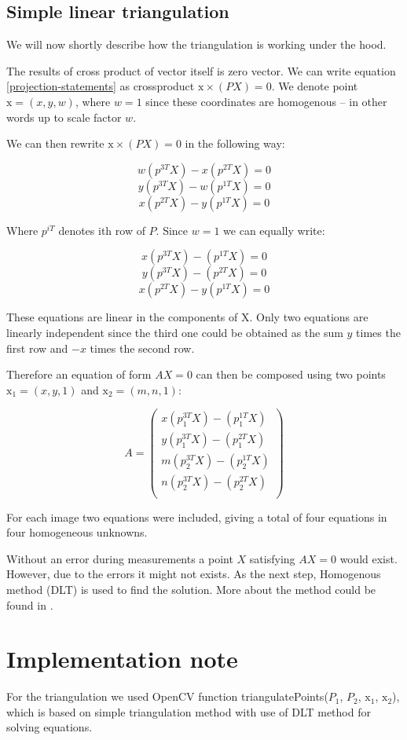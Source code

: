 \subsection{Simple linear triangulation}

We will now shortly describe how the triangulation is working under the hood.

The results of cross product of vector itself is zero vector. We can write
equation \ref{projection-statements} as crossproduct $\mathrm{x} \times (PX) = 0$. We
denote point $\mathrm{x} = (x, y, w)$, where $w = 1$ since these coordinates are
homogenous -- in other words up to scale factor $w$.

We can then rewrite $\mathrm{x} \times (PX) = 0$ in the following way:

$$ w(p^{3T}X) - x(p^{2T}X) = 0 $$
$$ y(p^{3T}X) - w(p^{1T}X) = 0 $$
$$ x(p^{2T}X) - y(p^{1T}X) = 0 $$

Where $p^{iT}$ denotes ith row of $P$. Since $w = 1$ we can equally write:

$$ x(p^{3T}X) - (p^{1T}X) = 0 $$
$$ y(p^{3T}X) - (p^{2T}X) = 0 $$
$$ x(p^{2T}X) - y(p^{1T}X) = 0 $$

These equations are linear in the components of X. Only two equations are
linearly independent since the third one could be obtained as the sum $y$
times the first row and $-x$ times the second row.

Therefore an equation of form $AX = 0$ can then be composed using two points $\mathrm{x_1} = (x, y, 1)$ and $\mathrm{x_2} = (m, n, 1)$:

\[
A = \begin{pmatrix}
x(p_1^{3T}X) - (p_1^{1T}X) \\
y(p_1^{3T}X) - (p_1^{2T}X) \\
m(p_2^{3T}X) - (p_2^{1T}X) \\
n(p_2^{3T}X) - (p_2^{2T}X) \\
\end{pmatrix}
\]

For each image two equations were included, giving a total of four equations in
four homogeneous unknowns.

Without an error during measurements a point $X$ satisfying $AX = 0$ would
exist. However, due to the errors it might not exists. As the next step, Homogenous
method (DLT) is used to find the solution. More about the method could be found
in \citet*{multiple-view-geometry}.

\section{Implementation note}
For the triangulation we used OpenCV function triangulatePoints($P_1$, $P_2$,
$\mathrm{x_1}$, $\mathrm{x_2}$), which is based on simple triangulation method with use of DLT
method for solving equations.
